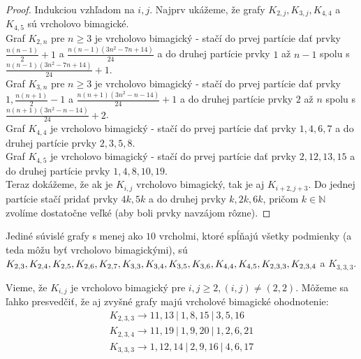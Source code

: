 \begin{proof} Indukciou vzhľadom na $i,j$. Najprv ukážeme, že grafy $K_{2,j}, K_{3,j}, K_{4,4}$ a $K_{4,5}$ sú vrcholovo bimagické. \\

Graf $K_{2,n}$ pre $n \geq 3$ je vrcholovo bimagický - stačí do prvej partície dať prvky $\frac{n(n-1)}{2} + 1$ a $\frac{n(n-1)(3n^2 - 7n + 14)}{24}$ a do druhej partície prvky $1$ až $n - 1$ spolu s $\frac{n(n-1)(3n^2 - 7n + 14)}{24} + 1$. \\

Graf $K_{3,n}$ pre $n \geq 3$ je vrcholovo bimagický - stačí do prvej partície dať prvky $1, \frac{n(n+1)}{2} - 1$ a $\frac{n(n+1)(3n^2 - n - 14)}{24} + 1$ a do druhej partície prvky $2$ až $n$ spolu s $\frac{n(n+1)(3n^2 - n - 14)}{24} + 2$. \\

Graf $K_{4,4}$ je vrcholovo bimagický - stačí do prvej partície dať prvky $1, 4, 6, 7$ a do druhej partície prvky $2, 3, 5, 8$. \\

Graf $K_{4,5}$ je vrcholovo bimagický - stačí do prvej partície dať prvky $2, 12, 13, 15$ a do druhej partície prvky $1, 4, 8, 10, 19$. \\

Teraz dokážeme, že ak je $K_{i,j}$ vrcholovo bimagický, tak je aj $K_{i+2,j+3}$. Do jednej partície stačí pridať prvky $4k, 5k$ a do druhej prvky $k, 2k, 6k$, pričom $k \in \mathbb{N}$ zvolíme dostatočne veľké (aby boli prvky navzájom rôzne).
\end{proof}

\begin{result} Jediné súvislé grafy s menej ako $10$ vrcholmi, ktoré spĺňajú všetky podmienky (a teda môžu byť vrcholovo bimagickými), sú $K_{2,3}, K_{2,4}, K_{2,5}, K_{2,6}, K_{2,7}, K_{3,3}, \\
K_{3,4}, K_{3,5}, K_{3,6}, K_{4,4}, K_{4,5}, K_{2,3,3}, K_{2,3,4}$ a $K_{3,3,3}$.
\end{result}

Vieme, že $K_{i,j}$ je vrcholovo bimagický pre $i,j \geq 2, (i,j) \neq (2,2)$. Môžeme sa ľahko presvedčiť, že aj zvyšné grafy majú vrcholové bimagické ohodnotenie:
\begin{gather*}
K_{2,3,3} \rightarrow 11, 13 ~|~ 1, 8, 15 ~|~ 3, 5, 16 \\
K_{2,3,4} \rightarrow 11, 19 ~|~ 1, 9, 20 ~|~ 1, 2, 6, 21 \\
K_{3,3,3} \rightarrow 1, 12, 14 ~|~ 2, 9, 16 ~|~ 4, 6, 17
\end{gather*}

